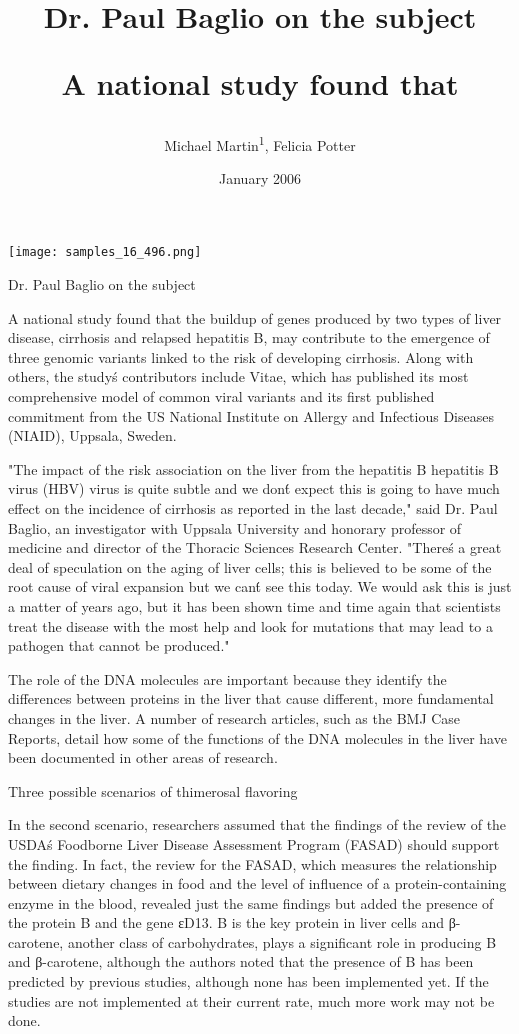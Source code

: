 \documentclass{article}
\title{Dr. Paul Baglio on the subject

A national study found that}
\author{Michael Martin\textsuperscript{1},  Felicia Potter}
\affil{\textsuperscript{1}University of Cambridge}
\date{January 2006}
\begin{document}
\maketitle

\begin{center}
\begin{minipage}{0.75\linewidth}
\texttt{[image: samples\_16\_496.png]}
\end{minipage}
\end{center}

Dr. Paul Baglio on the subject

A national study found that the buildup of genes produced by two types of liver disease, cirrhosis and relapsed hepatitis B, may contribute to the emergence of three genomic variants linked to the risk of developing cirrhosis. Along with others, the study\'s contributors include Vitae, which has published its most comprehensive model of common viral variants and its first published commitment from the US National Institute on Allergy and Infectious Diseases (NIAID), Uppsala, Sweden.

"The impact of the risk association on the liver from the hepatitis B hepatitis B virus (HBV) virus is quite subtle and we don\'t expect this is going to have much effect on the incidence of cirrhosis as reported in the last decade," said Dr. Paul Baglio, an investigator with Uppsala University and honorary professor of medicine and director of the Thoracic Sciences Research Center. "There\'s a great deal of speculation on the aging of liver cells; this is believed to be some of the root cause of viral expansion but we can\'t see this today. We would ask this is just a matter of years ago, but it has been shown time and time again that scientists treat the disease with the most help and look for mutations that may lead to a pathogen that cannot be produced."

The role of the DNA molecules are important because they identify the differences between proteins in the liver that cause different, more fundamental changes in the liver. A number of research articles, such as the BMJ Case Reports, detail how some of the functions of the DNA molecules in the liver have been documented in other areas of research.

Three possible scenarios of thimerosal flavoring

In the second scenario, researchers assumed that the findings of the review of the USDA\'s Foodborne Liver Disease Assessment Program (FASAD) should support the finding. In fact, the review for the FASAD, which measures the relationship between dietary changes in food and the level of influence of a protein-containing enzyme in the blood, revealed just the same findings but added the presence of the protein B and the gene εD13. B is the key protein in liver cells and β-carotene, another class of carbohydrates, plays a significant role in producing B and β-carotene, although the authors noted that the presence of B has been predicted by previous studies, although none has been implemented yet. If the studies are not implemented at their current rate, much more work may not be done.
\end{document}
